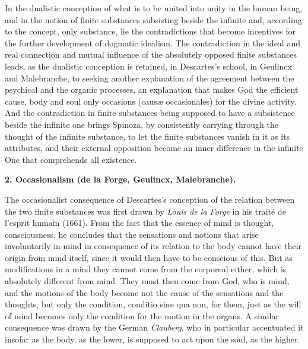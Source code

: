 In the dualistic conception of what is to be united into unity in the human being, and in the notion of finite substances subsisting beside the infinite and, according to the concept, only substance, lie the contradictions that become incentives for the further development of dogmatic idealism. The contradiction in the ideal and real connection and mutual influence of the absolutely opposed finite substances leads, as the dualistic conception is retained, in Descartes's school, in Geulincx and Malebranche, to seeking another explanation of the agreement between the psychical and the organic processes, an explanation that makes God the efficient cause, body and soul only occasions (causæ occasionales) for the divine activity. And the contradiction in finite substances being supposed to have a subsistence beside the infinite one brings Spinoza, by consistently carrying through the thought of the infinite substance, to let the finite substances vanish in it as its attributes, and their external opposition become an inner difference in the infinite One that comprehends all existence.

\divrule

\begin{center}
  \textbf{2. Occasionalism (de la Forge, Geulincx, Malebranche).}
\end{center}

The occasionalist consequence of Descartes's conception of the relation
between the two finite substances was first drawn by \emph{Louis de la
Forge} in his traité de l'esprit humain (1661). From the fact that the
essence of mind is thought, consciousness, he concludes that the
sensations and notions that arise involuntarily in mind in consequence
of its relation to the body cannot have their origin from mind itself,
since it would then have to be conscious of this. But as modifications in
a mind they cannot come from the corporeal either, which is absolutely
different from mind. They must then come from God, who is mind, and
the motions of the body become not the cause of the sensations and the
thoughts, but only the condition, conditio sine qua non, for
them, just as the will of mind becomes only the condition for the
motion in the organs. A similar consequence was drawn by the German
\emph{Clauberg}, who in particular accentuated it insofar as the body, as
the lower, is supposed to act upon the soul, as the higher.

\divrule

